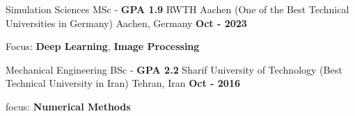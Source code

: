 

\begin{cventries}

  \cventry
    {Simulation Sciences MSc - \textbf{GPA 1.9}} %
    {RWTH Aachen (One of the Best Technical Universities in Germany)} %
    {Aachen, Germany} %
    {\textbf{Oct - 2023}} %
    {
      \begin{cvitems} %
        \item {Focus: \textbf{Deep Learning}, \textbf{Image Processing}}
      \end{cvitems}
    }
    
  \cventry
    {Mechanical Engineering BSc - \textbf{GPA 2.2}} %
    {Sharif University of Technology (Best Technical University in Iran)} %
    {Tehran, Iran} %
    {\textbf{Oct - 2016}} %
    {
      \begin{cvitems} %
        \item {focus: \textbf{Numerical Methods}} 
      \end{cvitems}
    }

\end{cventries}
